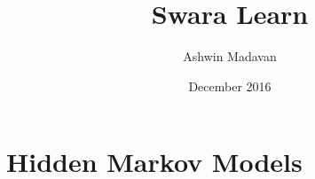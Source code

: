 \documentclass{article}
\title{Swara Learn}
\author{Ashwin Madavan}
\date{December 2016}
\theoremstyle{definition}
\begin{document}
\maketitle

\section{Hidden Markov Models}

\end{document}
